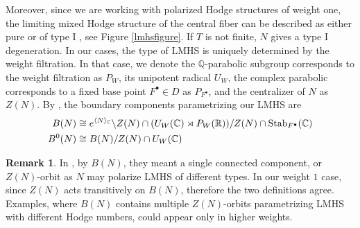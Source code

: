 \documentclass[12pt, letterpaper]{amsart}
\theoremstyle{plain}
\theoremstyle{definition}
\newtheorem{remark}[theorem]{Remark}
\begin{document}
Moreover, since we are working with polarized Hodge structures of weight one, the limiting mixed Hodge structure of the central fiber can be described as either pure or of type I , see Figure \ref{lmhsfigure}.
If $T$ is not finite, $N$ gives a type I degeneration. 
In our cases, the type of LMHS is uniquely determined by the weight filtration.
In that case, 
we denote the $\mathbb{Q}$-parabolic subgroup corresponds to the weight filtration as $P_W$,  its unipotent radical $U_W$, the complex parabolic corresponds to a fixed base point 
$F^{\bullet}\in D$ as $P_{F^{\bullet}}$, and the centralizer of $N$ as $Z(N)$.
By \cite[chap. 7]{KP16}, the boundary components parametrizing our LMHS are
\begin{align}\label{hodgebdcomp}
 B(N)
&\cong e^{\langle N\rangle_{\mathbb{C}}} \backslash Z(N)\cap(U_W(\mathbb{C})\rtimes P_W(\mathbb{R}))/Z(N)\cap \mathrm{Stab}_{F^{\bullet}}(\mathbb{C})   
\\
B^0(N)
& \cong B(N)/Z(N)\cap U_W(\mathbb{C})
\notag
\end{align}

\begin{remark}
In \cite{KP16}, by $B(N)$, they meant a single connected component, or $Z(N)$-orbit as $N$ may polarize LMHS of different types. In our weight $1$ case, since $Z(N)$ acts transitively on $B(N)$, therefore the two definitions agree. Examples, where $B(N)$ contains multiple $Z(N)$-orbits parametrizing LMHS with different Hodge numbers, could appear only in higher weights.
\end{remark}
\end{document}
